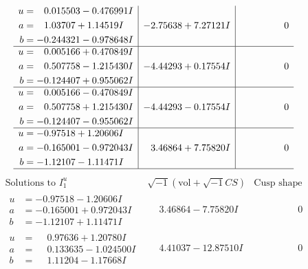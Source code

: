 \documentclass[1p]{elsarticle_modified}
\theoremstyle{definition}
\newcommand{\I}{\sqrt{-1}}
\begin{document}
$$\begin{array}{c|c|c}
\begin{aligned}
u &= \phantom{-}0.015503 - 0.476991 I \\
a &= \phantom{-}1.03707 + 1.14519 I \\
b &= -0.244321 - 0.978648 I\end{aligned}
 & -2.75638 + 7.27121 I & \phantom{-0.000000 } 0 \\ \hline\begin{aligned}
u &= \phantom{-}0.005166 + 0.470849 I \\
a &= \phantom{-}0.507758 - 1.215430 I \\
b &= -0.124407 + 0.955062 I\end{aligned}
 & -4.44293 + 0.17554 I & \phantom{-0.000000 } 0 \\ \hline\begin{aligned}
u &= \phantom{-}0.005166 - 0.470849 I \\
a &= \phantom{-}0.507758 + 1.215430 I \\
b &= -0.124407 - 0.955062 I\end{aligned}
 & -4.44293 - 0.17554 I & \phantom{-0.000000 } 0 \\ \hline\begin{aligned}
u &= -0.97518 + 1.20606 I \\
a &= -0.165001 - 0.972043 I \\
b &= -1.12107 - 1.11471 I\end{aligned}
 & \phantom{-}3.46864 + 7.75820 I & \phantom{-0.000000 } 0\\
 \hline 
 \end{array}$$\newpage$$\begin{array}{c|c|c}  
\text{Solutions to }I^u_{1}& \I (\text{vol} + \sqrt{-1}CS) & \text{Cusp shape}\\
 \hline 
\begin{aligned}
u &= -0.97518 - 1.20606 I \\
a &= -0.165001 + 0.972043 I \\
b &= -1.12107 + 1.11471 I\end{aligned}
 & \phantom{-}3.46864 - 7.75820 I & \phantom{-0.000000 } 0 \\ \hline\begin{aligned}
u &= \phantom{-}0.97636 + 1.20780 I \\
a &= \phantom{-}0.133635 - 1.024500 I \\
b &= \phantom{-}1.11204 - 1.17668 I\end{aligned}
 & \phantom{-}4.41037 - 12.87510 I & \phantom{-0.000000 } 0 \\ \hline\begin{aligned}

\end{aligned}
\end{array}$$
\end{document}
